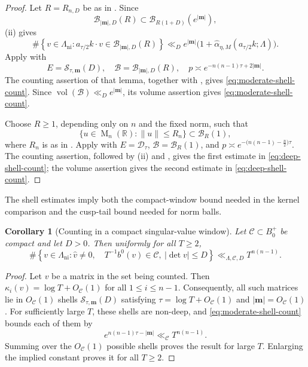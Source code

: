 \documentclass[reqno,11pt]{amsart}
\numberwithin{equation}{section}
\newtheorem{corollary}[theorem]{Corollary}
\theoremstyle{definition}
\theoremstyle{remark}
\newcommand{\op}{\operatorname}
\newcommand{\M}{\op{M}}
\begin{document}
\begin{proof}
Let $R=R_{n,D}$ be as in . Since
\begin{equation}\label{eq:long-box-containment}
\mathcal B_{|\mathbf m|,D}(R)
\subset\mathscr B_{R(1+D)}(e^{|\mathbf m|}),
\end{equation}
(ii) gives
$$
\#\left\{v\in\Lambda_{\operatorname{ni}}:
a_{\tau/2}k\cdot v\in\mathcal B_{|\mathbf m|,D}(R)
\right\}
\ll_D
e^{|\mathbf m|}
\bigl(1+\widehat\alpha_{\eta,M}(a_{\tau/2}k;\Lambda)\bigr).
$$
Apply  with
$$
E=\mathcal S_{\tau,\mathbf m}(D),
\quad
\mathscr B=\mathcal B_{|\mathbf m|,D}(R),
\quad
p\asymp e^{-n(n-1)\tau+2|\mathbf m|}.
$$
The counting assertion of that lemma, together with
, gives
\eqref{eq:moderate-shell-count}. Since
$\operatorname{vol}(\mathscr B)\ll_D e^{|\mathbf m|}$, its volume
assertion gives \eqref{eq:moderate-shell-count}.

Choose $R\ge1$, depending only on $n$ and the fixed norm, such that
$$
\{u\in\M_n(\mathbb R):\|u\|\le R_n\}
\subset\mathscr B_R(1),
$$
where $R_n$ is as in .
Apply  with
$E=\mathcal D_\tau$, $\mathscr B=\mathscr B_R(1)$, and
$p\asymp e^{-\bigl(n(n-1)-\frac n2\bigr)\tau}$. The counting assertion, followed by
(ii) and
, gives
the first estimate in \eqref{eq:deep-shell-count}; the volume assertion gives
the second estimate in \eqref{eq:deep-shell-count}.
\end{proof}

The shell estimates imply both the compact-window bound needed in the kernel
comparison and the cusp-tail bound needed for norm balls.

\begin{corollary}[Counting in a compact singular-value window]
\label{lem:weightedcontributioncount}
Let $\mathscr C\subset B_0^+$ be compact and let $D>0$.  Then uniformly for all $T\ge2$,
$$
\#\left\{v\in\Lambda_{\operatorname{ni}}:
\widehat v\ne0,\quad
T^{-1}b^0(v)\in\mathscr C,
\ |\det v|\le D
\right\}
\ll_{\Lambda,\mathscr C,D}
T^{n(n-1)}.
$$
\end{corollary}
\begin{proof}
Let $v$ be a matrix in the set being counted. Then
$
\kappa_i(v)=\log T+O_{\mathscr C}(1)$
for all $1\le i\le n-1$.
Consequently, all such matrices lie in
$O_{\mathscr C}(1)$ shells
$\mathcal S_{\tau,\mathbf m}(D)$ satisfying
$
\tau=\log T+O_{\mathscr C}(1)$ and $|\mathbf m|=O_{\mathscr C}(1)$.
For sufficiently large $T$, these shells are non-deep, and
\eqref{eq:moderate-shell-count} bounds each of them by
$$
e^{n(n-1)\tau-|\mathbf m|}
\ll_{\mathscr C}T^{n(n-1)}.
$$
Summing over the $O_{\mathscr C}(1)$ possible shells proves the result
for large $T$. Enlarging the implied constant proves it for all $T\ge 2$.
\end{proof}
\end{document}
